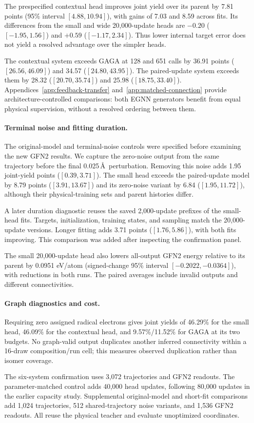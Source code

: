 The prespecified contextual head improves joint yield over its parent by 7.81 points (95\% interval $[4.88,10.94]$), with gains of 7.03 and 8.59 across fits. Its differences from the small and wide 20,000-update heads are $-0.20$ ($[-1.95,1.56]$) and $+0.59$ ($[-1.17,2.34]$). Thus lower internal target error does not yield a resolved advantage over the simpler heads.

The contextual system exceeds GAGA at 128 and 651 calls by 36.91 points ($[26.56,46.09]$) and 34.57 ($[24.80,43.95]$). The paired-update system exceeds them by 28.32 ($[20.70,35.74]$) and 25.98 ($[18.75,33.40]$). Appendices~\ref{app:feedback-transfer} and~\ref{app:matched-connection} provide architecture-controlled comparisons: both EGNN generators benefit from equal physical supervision, without a resolved ordering between them.

\paragraph{Terminal noise and fitting duration.}
The original-model and terminal-noise controls were specified before examining the new GFN2 results. We capture the zero-noise output from the same trajectory before the final 0.025\,\AA\ perturbation. Removing this noise adds 1.95 joint-yield points ($[0.39,3.71]$). The small head exceeds the paired-update model by 8.79 points ($[3.91,13.67]$) and its zero-noise variant by 6.84 ($[1.95,11.72]$), although their physical-training sets and parent histories differ.

A later duration diagnostic reuses the saved 2,000-update prefixes of the small-head fits. Targets, initialization, training states, and sampling match the 20,000-update versions. Longer fitting adds 3.71 points ($[1.76,5.86]$), with both fits improving. This comparison was added after inspecting the confirmation panel.

The small 20,000-update head also lowers all-output GFN2 energy relative to its parent by 0.0951 eV/atom (signed-change 95\% interval $[-0.2022,-0.0364]$), with reductions in both runs. The paired averages include invalid outputs and different connectivities.

\paragraph{Graph diagnostics and cost.}
Requiring zero assigned radical electrons gives joint yields of 46.29\% for the small head, 46.09\% for the contextual head, and 9.57\%/11.52\% for GAGA at its two budgets. No graph-valid output duplicates another inferred connectivity within a 16-draw composition/run cell; this measures observed duplication rather than isomer coverage.

The six-system confirmation uses 3,072 trajectories and GFN2 readouts. The parameter-matched control adds 40,000 head updates, following 80,000 updates in the earlier capacity study. Supplemental original-model and short-fit comparisons add 1,024 trajectories, 512 shared-trajectory noise variants, and 1,536 GFN2 readouts. All reuse the physical teacher and evaluate unoptimized coordinates.
